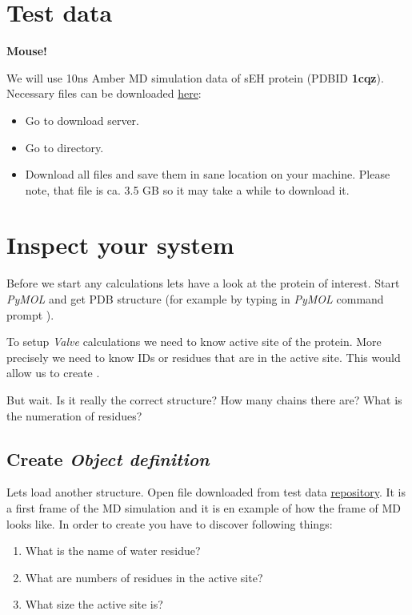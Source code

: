 \documentclass[a4paper,10pt,english]{sphinxmanual}
\begin{document}
\section{Test data}
\label{valve/valve_tutorial:test-data}
\textbf{Mouse!}

We will use 10ns Amber MD simulation data of sEH protein (PDBID \textbf{1cqz}). Necessary files can be downloaded \href{http://localhost:8001}{here}:
\begin{itemize}
\item {} 
Go to download server.

\item {} 
Go to  directory.

\item {} 
Download all files and save them in sane location on your machine. Please note, that  file is ca. 3.5 GB so it may take a while to download it.

\end{itemize}


\section{Inspect your system}
\label{valve/valve_tutorial:inspect-your-system}
Before we start any calculations lets have a look at the protein of interest. Start \emph{PyMOL} and get  PDB structure (for example by typing in \emph{PyMOL} command prompt ).

To setup \emph{Valve} calculations we need to know active site of the protein. More precisely we need to know IDs or residues that are in the active site. This would allow us to create {\hyperref[valve/valve_manual:object\string-definition]{}}.

But wait. Is it really the correct structure? How many chains there are? What is the numeration of residues?


\subsection{Create \emph{Object definition}}
\label{valve/valve_tutorial:create-object-definition}
Lets load another structure. Open file  downloaded from test data \href{http://localhost:8001}{repository}. It is a first frame of the MD simulation and it is en example of how the frame of MD looks like. In order to create {\hyperref[valve/valve_manual:object\string-definition]{}} you have to discover following things:
\begin{enumerate}
\item {} 
What is the name of water residue?

\item {} 
What are numbers of residues in the active site?

\item {} 
What size the active site is?

\end{enumerate}
\end{document}
